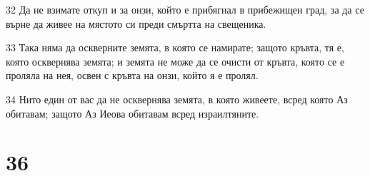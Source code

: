 \par 32 Да не взимате откуп и за онзи, който е прибягнал в прибежищен град, за да се върне да живее на мястото си преди смъртта на свещеника.
\par 33 Така няма да оскверните земята, в която се намирате; защото кръвта, тя е, която осквернява земята; и земята не може да се очисти от кръвта, която се е проляла на нея, освен с кръвта на онзи, който я е пролял.
\par 34 Нито един от вас да не осквернява земята, в която живеете, всред която Аз обитавам; защото Аз Иеова обитавам всред израилтяните.

\chapter{36}

